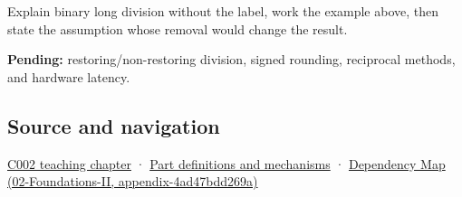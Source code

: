 Explain binary long division without the label, work the example above, then state the assumption whose removal would change the result.

\textbf{Pending:} restoring/non-restoring division, signed rounding, reciprocal methods, and hardware latency.

\subsection{Source and navigation}\label{source-and-navigation}

\href{Continuous\%20Notes/Computing\%20Foundations\%20-\%20From\%20Bits\%20to\%20C++\%20and\%20Systems\%20APIs\#Arithmetic\%20becomes\%20a\%20policy}{C002 teaching chapter} · \hyperref[appendix-fd090d982a15]{Part definitions and mechanisms} · \href{}{Dependency Map (02-Foundations-II, appendix-4ad47bdd269a)}
